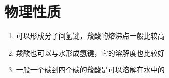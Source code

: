 \section{物理性质}

\begin{enumerate}
    \item 可以形成分子间氢键，羧酸的熔沸点一般比较高
    \item 羧酸也可以与水形成氢键，它的溶解度也比较好
    \item 一般一个碳到四个碳的羧酸是可以溶解在水中的
\end{enumerate}
